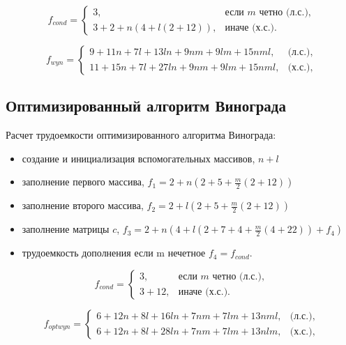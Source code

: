 \begin{equation}
    \label{eq:cond}
    f_{cond} =
    \begin{cases}
        3, & \text{если $m$ четно (л.с.),}\\
        3 + 2 + n(4 + l(2 + 12)), & \text{иначе (х.с.).}
    \end{cases}
\end{equation}

\begin{equation}
    \label{eq:ans}
    f_{wyn} =
    \begin{cases}
        9 + 11n + 7l + 13ln + 9nm + 9lm + 15nml, & \text{(л.с.),}\\
        11 + 15n + 7l + 27ln + 9nm + 9lm + 15nml, & \text{(х.с.),}
    \end{cases}
\end{equation}

\subsection{Оптимизированный алгоритм Винограда}

Расчет трудоемкости оптимизированного алгоритма Винограда:

\begin{itemize}
    \item создание и инициализация вспомогательных массивов, $n + l$
    \item заполнение первого массива, $f_{1} = 2 + n(2 + 5 + \frac{m}{2}(2 + 12))$
    \item заполнение второго массива, $f_{2} = 2 + l(2 + 5 + \frac{m}{2}(2 + 12))$
    \item заполнение матрицы $c$, $f_{3} = 2 + n(4 + l(2 + 7 + 4 + \frac{m}{2}(4 + 22)) + f_{4})$
    \item трудоемкость дополнения если m нечетное $f_{4} = f_{cond}$.
\end{itemize}

\begin{equation}
    \label{eq:cond-2}
    f_{cond} =
    \begin{cases}
        3, & \text{если $m$ четно (л.с.),}\\
        3 + 12, & \text{иначе (х.с.).}
    \end{cases}
\end{equation}

\begin{equation}
    \label{eq:ans-2}
    f_{optwyn} =
    \begin{cases}
        6 + 12n + 8l + 16ln + 7nm + 7lm + 13nml, & \text{(л.с.),}\\
        6 + 12n + 8l + 28ln + 7nm + 7lm + 13nlm, & \text{(х.с.),}
    \end{cases}
\end{equation}

